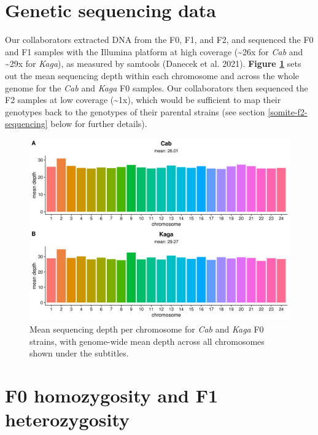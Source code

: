 \documentclass[
]{book}
\begin{document}
\clearpage

\hypertarget{genetic-sequencing-data}{%
\section{Genetic sequencing data}\label{genetic-sequencing-data}}

Our collaborators extracted DNA from the F0, F1, and F2, and sequenced the F0 and F1 samples with the Illumina platform at high coverage (\textasciitilde26x for \emph{Cab} and \textasciitilde29x for \emph{Kaga}), as measured by samtools (Danecek et al. 2021). \textbf{Figure \ref{fig:F0-coverage}} sets out the mean sequencing depth within each chromosome and across the whole genome for the \emph{Cab} and \emph{Kaga} F0 samples. Our collaborators then sequenced the F2 samples at low coverage (\textasciitilde1x), which would be sufficient to map their genotypes back to the genotypes of their parental strains (see section \ref{somite-f2-sequencing} below for further details).



\begin{figure}
\includegraphics[width=1\linewidth]{figs/somites/F0_coverage} \caption{Mean sequencing depth per chromosome for \emph{Cab} and \emph{Kaga} F0 strains, with genome-wide mean depth across all chromosomes shown under the subtitles.}\label{fig:F0-coverage}
\end{figure}

\clearpage

\hypertarget{f0-homozygosity-and-f1-heterozygosity}{%
\section{F0 homozygosity and F1 heterozygosity}\label{f0-homozygosity-and-f1-heterozygosity}}
\end{document}
